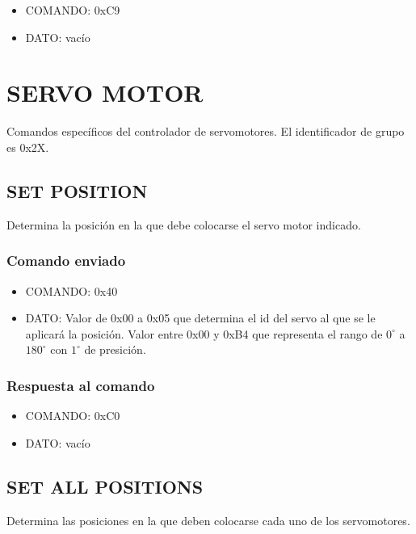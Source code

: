 \documentclass[a4paper,10pt]{article}
\begin{document}
\begin{itemize}
	\item{COMANDO:} 0xC9
	\item{DATO:} vac\'io
\end{itemize}

\section{SERVO MOTOR}
\label{grupo_servo_motor}

Comandos espec\'ificos del controlador de servomotores.
El identificador de grupo es 0x2X.

\subsection{SET POSITION}
\label{set_position}

Determina la posici\'on en la que debe colocarse el servo motor indicado.

\subsubsection*{Comando enviado}

\begin{itemize}
	\item{COMANDO:} 0x40
	\item{DATO:} Valor de 0x00 a 0x05 que determina el id del servo al que se le aplicar\'a la posici\'on.
	Valor entre 0x00 y 0xB4 que representa el rango de $0^{\circ}$ a $180^{\circ}$ con $1^{\circ}$ de presici\'on.
\end{itemize}

\subsubsection*{Respuesta al comando}

\begin{itemize}
	\item{COMANDO:} 0xC0
	\item{DATO:} vac\'io
\end{itemize}

\subsection{SET ALL POSITIONS}
\label{set_all_positions}

Determina las posiciones en la que deben colocarse cada uno de los servomotores.
\end{document}
